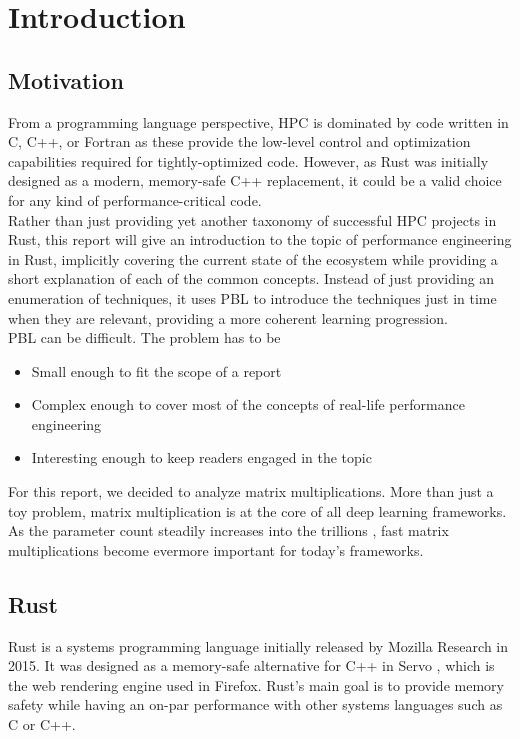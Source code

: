 \section{Introduction}
\subsection{Motivation}
From a programming language perspective, \ac{HPC} is dominated by code written in C, C++, or Fortran as these provide the low-level control and optimization capabilities required for tightly-optimized code. However, as Rust was initially designed as a modern, memory-safe C++ replacement, it could be a valid choice for any kind of performance-critical code.\\

Rather than just providing yet another taxonomy of successful \ac{HPC} projects in Rust, this report will give an introduction to the topic of performance engineering in Rust, implicitly covering the current state of the ecosystem while providing a short explanation of each of the common concepts. Instead of just providing an enumeration of techniques, it uses \ac{PBL} to introduce the techniques just in time when they are relevant, providing a more coherent learning progression.\\

\acl{PBL} can be difficult. The problem has to be
\begin{itemize}
  \item Small enough to fit the scope of a report
  \item Complex enough to cover most of the concepts of real-life performance engineering
  \item Interesting enough to keep readers engaged in the topic
\end{itemize}

For this report, we decided to analyze matrix multiplications. More than just a toy problem, matrix multiplication is at the core of all deep learning frameworks. As the parameter count steadily increases into the trillions \cite{gpt4}, fast matrix multiplications become evermore important for today's frameworks.

\subsection{Rust}
Rust \cite{rust} is a systems programming language initially released by Mozilla Research in 2015. It was designed as a memory-safe alternative for C++ in Servo \cite{servo}, which is the web rendering engine used in Firefox. Rust's main goal is to provide memory safety while having an on-par performance with other systems languages such as C or C++.\\

